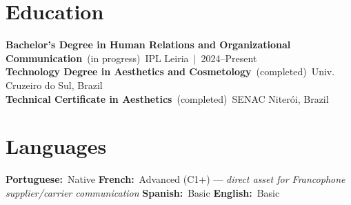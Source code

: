 \documentclass[10pt,a4paper]{article}
\begin{document}
\section{Education}

{\small\bfseries Bachelor's Degree in Human Relations and Organizational Communication}~{\small\color{subtle}(in progress)}~\hfill{\small IPL Leiria~$|$~2024--Present}\\
{\small\bfseries Technology Degree in Aesthetics and Cosmetology}~{\small\color{subtle}(completed)}~\hfill{\small Univ. Cruzeiro do Sul, Brazil}\\
{\small\bfseries Technical Certificate in Aesthetics}~{\small\color{subtle}(completed)}~\hfill{\small SENAC Niterói, Brazil}

\section{Languages}
{\small
\textbf{Portuguese:}~Native\quad
\textbf{French:}~Advanced (C1+) --- \textit{direct asset for Francophone supplier/carrier communication}\quad
\textbf{Spanish:}~Basic\quad
\textbf{English:}~Basic
}
\end{document}
